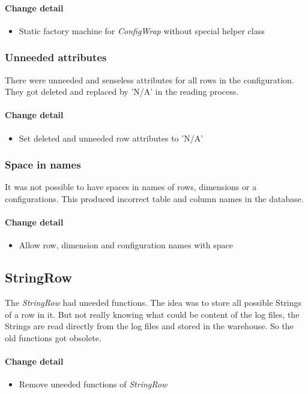 \paragraph{Change detail}
\begin{itemize}
  \item Static factory machine for \textit{ConfigWrap} without special helper class
\end{itemize}

\subsubsection{Unneeded attributes}
There were unneeded and senseless attributes for all rows in the configuration.
They got deleted and replaced by 'N/A' in the reading process.

\paragraph{Change detail}
\begin{itemize}
  \item Set deleted and unneeded row attributes to 'N/A'
\end{itemize}

\subsubsection{Space in names}
It was not possible to have spaces in names of rows, dimensions or a configurations. This
produced incorrect table and column names in the database.
\paragraph{Change detail}
\begin{itemize}
  \item Allow row, dimension and configuration names with space
\end{itemize}

\subsection{StringRow}
The \textit{StringRow} had uneeded functions. The idea was
to store all possible Strings of a row in it. But not really knowing what
could be content of the log files, the Strings are read directly from 
the log files and stored in the warehouse. So the old functions got obsolete.

\paragraph{Change detail}
\begin{itemize}
  \item Remove uneeded functions of \textit{StringRow} %
\end{itemize}

